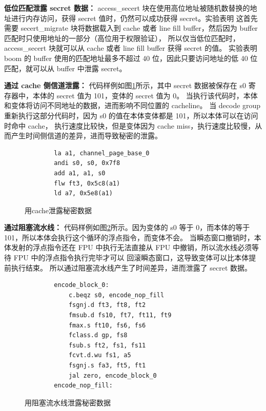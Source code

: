 \textbf{低位匹配泄露 secret 数据：}
access\_secert 块在使用高位地址被随机数替换的地址进行内存访问，获得 secret 值时，仍然可以成功获得 secret。实验表明
这首先需要 secert\_migrate 块将数据载入到 cache 或者 line fill buffer，然后因为 buffer 匹配时只使用地址的一部分（高位用于权限验证），
所以仅当低位匹配时，access\_secert 块就可以从 cache 或者 line fill buffer 获得 secret 的值。
实验表明 boom 的 buffer 使用的匹配地址最多不超过 40 位，因此只要访问地址的低 40 位匹配，就可以从 buffer 中泄露 secret。\par

\textbf{通过 cache 侧信道泄露：}
代码样例如图\ref{code:cache-channel}所示，其中 secret 数据被保存在 s0 寄存器中，本体的 secret 值为 101，变体的 secret 值为 0。
当执行该代码时，本体和变体将访问不同地址的数据，进而影响不同位置的 cacheline。
当 decode group 重新执行这部分代码时，因为 s0 的值在本体变体都是 101，所以本体可以在访问时命中 cache，
执行速度比较快，但是变体因为 cache miss，执行速度比较慢，从而产生时间侧信道的差异，进而导致秘密的泄露。\par

\begin{figure}[htbp]
    \centering
    \begin{verbatim}
        la a1, channel_page_base_0
        andi s0, s0, 0x7f8
        add a1, a1, s0
        flw ft3, 0x5c8(a1)
        ld a7, 0x5e8(a1)
    \end{verbatim}
    \caption{用cache泄露秘密数据}
    \label{code:cache-channel}
\end{figure}

\textbf{通过阻塞流水线：}
代码样例如图\ref{code:port-stall}所示。因为变体的 s0 等于 0，而本体的等于 101，所以本体会执行这个循环的浮点指令，而变体不会。
当瞬态窗口撤销时，本体发射的浮点指令还在 FPU 中执行无法直接从 FPU 中撤销，所以流水线必须等待 FPU 中的浮点指令执行完毕才可以
回滚瞬态窗口，这导致变体可以比本体提前执行结束。
所以通过阻塞流水线产生了时间差异，进而泄露了 secret 数据。\par

\begin{figure}[htbp]
    \centering
    \begin{verbatim}
        encode_block_0:
            c.beqz s0, encode_nop_fill
            fsgnj.d ft3, ft8, ft2
            fmsub.d fs10, ft7, ft11, ft9
            fmax.s ft10, fs6, fs6
            fclass.d gp, fs8
            fsub.s ft2, fs1, fs11
            fcvt.d.wu fs1, a5
            fsgnj.s fa3, ft5, ft1
            jal zero, encode_block_0
        encode_nop_fill:
    \end{verbatim}
    \caption{用阻塞流水线泄露秘密数据}
    \label{code:port-stall}
\end{figure}

